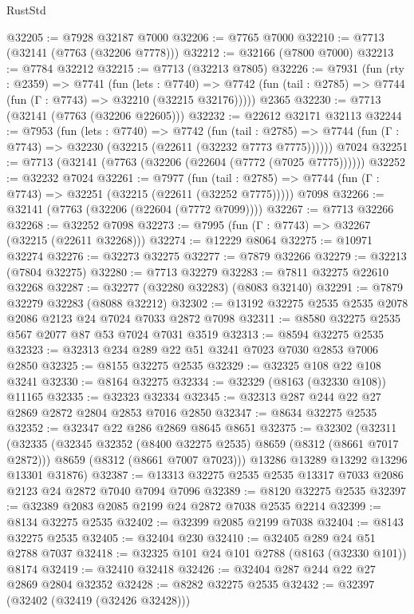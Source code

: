 \begin{lexlean}{RustStd}
\begin{coremodule}
@32205 := @7928 @32187 @7000
@32206 := @7765 @7000
@32210 := @7713 (@32141 (@7763 (@32206 @7778)))
@32212 := @32166 (@7800 @7000)
@32213 := @7784 @32212
@32215 := @7713 (@32213 @7805)
@32226 := @7931
    (fun (rty : @2359) =>
    @7741
      (fun (lets : @7740) =>
      @7742 (fun (tail : @2785) => @7744 (fun (Γ : @7743) => @32210 (@32215 @32176)))))
    @2365
@32230 := @7713 (@32141 (@7763 (@32206 @22605)))
@32232 := @22612 @32171 @32113
@32244 := @7953
    (fun (lets : @7740) =>
    @7742
      (fun (tail : @2785) =>
      @7744 (fun (Γ : @7743) => @32230 (@32215 (@22611 (@32232 @7773 @7775))))))
    @7024
@32251 := @7713 (@32141 (@7763 (@32206 (@22604 (@7772 (@7025 @7775))))))
@32252 := @32232 @7024
@32261 := @7977
    (fun (tail : @2785) => @7744 (fun (Γ : @7743) => @32251 (@32215 (@22611 (@32252 @7775)))))
    @7098
@32266 := @32141 (@7763 (@32206 (@22604 (@7772 @7099))))
@32267 := @7713 @32266
@32268 := @32252 @7098
@32273 := @7995 (fun (Γ : @7743) => @32267 (@32215 (@22611 @32268)))
@32274 := @12229 @8064
@32275 := @10971 @32274
@32276 := @32273 @32275
@32277 := @7879 @32266
@32279 := @32213 (@7804 @32275)
@32280 := @7713 @32279
@32283 := @7811 @32275 @22610 @32268
@32287 := @32277 (@32280 @32283) (@8083 @32140)
@32291 := @7879 @32279 @32283 (@8088 @32212)
@32302 := @13192 @32275 @2535 @2535 @2078 @2086 @2123 @24 @7024 @7033 @2872 @7098
@32311 := @8580 @32275 @2535 @567 @2077 @87 @53 @7024 @7031 @3519
@32313 := @8594 @32275 @2535
@32323 := @32313 @234 @289 @22 @51 @3241 @7023 @7030 @2853 @7006 @2850
@32325 := @8155 @32275 @2535
@32329 := @32325 @108 @22 @108 @3241
@32330 := @8164 @32275
@32334 := @32329 (@8163 (@32330 @108)) @11165
@32335 := @32323 @32334
@32345 := @32313 @287 @244 @22 @27 @2869 @2872 @2804 @2853 @7016 @2850
@32347 := @8634 @32275 @2535
@32352 := @32347 @22 @286 @2869 @8645 @8651
@32375 := @32302
    (@32311
      (@32335
        (@32345 @32352 (@8400 @32275 @2535) @8659 (@8312 (@8661 @7017 @2872)))
        @8659
        (@8312 (@8661 @7007 @7023)))
      @13286
      @13289
      @13292
      @13296
      @13301
      @31876)
@32387 := @13313 @32275 @2535 @2535 @13317 @7033 @2086 @2123 @24 @2872 @7040 @7094 @7096
@32389 := @8120 @32275 @2535
@32397 := @32389 @2083 @2085 @2199 @24 @2872 @7038 @2535 @2214
@32399 := @8134 @32275 @2535
@32402 := @32399 @2085 @2199 @7038
@32404 := @8143 @32275 @2535
@32405 := @32404 @230
@32410 := @32405 @289 @24 @51 @2788 @7037
@32418 := @32325 @101 @24 @101 @2788 (@8163 (@32330 @101)) @8174
@32419 := @32410 @32418
@32426 := @32404 @287 @244 @22 @27 @2869 @2804 @32352
@32428 := @8282 @32275 @2535
@32432 := @32397 (@32402 (@32419 (@32426 @32428)))

\end{coremodule}
\end{lexlean}
